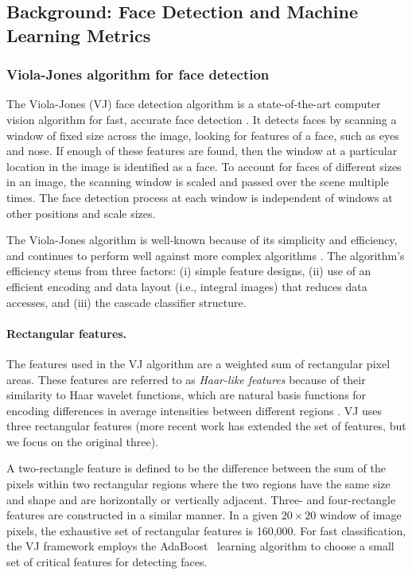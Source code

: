 \subsection{Background: Face Detection and Machine Learning Metrics}
\label{sec:backvj}

\subsubsection{Viola-Jones algorithm for face detection}

The Viola-Jones (VJ) face detection algorithm is a state-of-the-art computer vision algorithm for fast, accurate face detection \cite{vj_journal}. It detects faces by scanning a window of fixed size across the image, looking for features of a face, such as eyes and nose. If enough of these features are found, then the window at a particular location in the image is identified as a face. To account for faces of different sizes in an image, the scanning window is scaled and passed over the scene multiple times. The face detection process at each window is independent of windows at other positions and scale sizes.

The Viola-Jones algorithm is well-known because of its simplicity and efficiency,
and continues to perform well against more complex algorithms \cite{mathias_fd}.
The algorithm's efficiency stems from three factors: (i) simple feature
designs, (ii) use of an efficient encoding and data layout (i.e., integral images) that reduces data accesses, and (iii) the cascade classifier structure.

\paragraph{Rectangular features.} The features used in the VJ algorithm
are a weighted sum of rectangular pixel areas. These features are referred to
as \textit{Haar-like features} because of their similarity to Haar wavelet
functions, which are natural basis functions for encoding differences in average intensities
between different regions \cite{haar_basis}.
VJ uses three rectangular features (more
recent work has extended the set of features, but we focus on the original three).

A two-rectangle feature is defined to be the difference between the sum of the
pixels within two rectangular regions where the two regions have the same size
and shape and are horizontally or vertically adjacent. Three- and four-rectangle
features are constructed in a similar manner. In a given $20\times 20$ window of image
pixels, the exhaustive set of rectangular features is 160,000. For fast
classification, the VJ framework employs the AdaBoost~\cite{adaboost} learning algorithm to choose a
small set of critical features for detecting faces.

